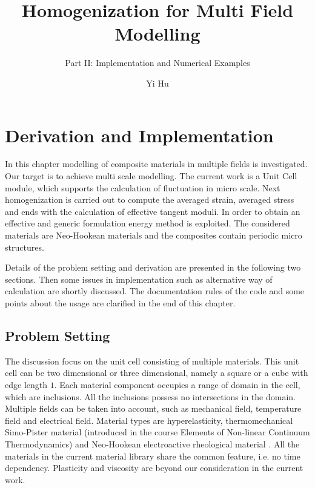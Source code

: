 \documentclass[10pt,a4paper]{scrreprt}
\author{Yi Hu}
\title{Homogenization for Multi Field Modelling}
\subtitle{Part II: Implementation and Numerical Examples}
\begin{document}
\chapter{Derivation and Implementation}
In this chapter modelling of composite materials in multiple fields is investigated. Our target is to achieve multi scale modelling. The current work is a Unit Cell module, which supports the calculation of fluctuation in micro scale. Next homogenization is carried out to compute the averaged strain, averaged stress and ends with the calculation of effective tangent moduli. In order to obtain an effective and generic formulation energy method is exploited. The considered materials are Neo-Hookean materials and the composites contain periodic micro structures.

Details of the problem setting and derivation are presented in the following two sections. Then some issues in implementation such as alternative way of calculation are shortly discussed. The documentation rules of the code and some points about the usage are clarified in the end of this chapter.

\section{Problem Setting}
The discussion focus on the unit cell consisting of multiple materials. This unit cell can be two dimensional or three dimensional, namely a square or a cube with edge length $1$. Each material component occupies a range of domain in the cell, which are inclusions. All the inclusions possess no intersections in the domain. Multiple fields can be taken into account, such as mechanical field, temperature field and electrical field. Material types are hyperelasticity, thermomechanical Simo-Pister material (introduced in the course Elements of Non-linear Continuum Thermodynamics) and Neo-Hookean electroactive rheological material \citep{SchKei:2012:tho}. All the materials in the current material library share the common feature, i.e. no time dependency. Plasticity and viscosity are beyond our consideration in the current work.
\end{document}
